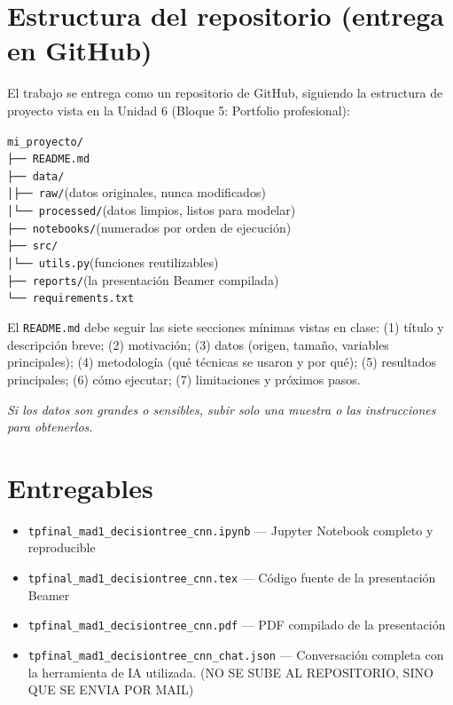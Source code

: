 \documentclass[11pt,a4paper]{article}
\newcommand{\codigo}[1]{\texttt{#1}}
\begin{document}
\section{Estructura del repositorio (entrega en GitHub)}
El trabajo se entrega como un repositorio de GitHub, siguiendo la estructura de proyecto vista en la Unidad 6 (Bloque 5: Portfolio profesional):
\begin{center}
\begin{minipage}{0.82\textwidth}
\codigo{mi\_proyecto/}\\
\codigo{\phantom{x}├── README.md}\\
\codigo{\phantom{x}├── data/}\\
\codigo{\phantom{x}│\phantom{xx}├── raw/}\hfill (datos originales, nunca modificados)\\
\codigo{\phantom{x}│\phantom{xx}└── processed/}\hfill (datos limpios, listos para modelar)\\
\codigo{\phantom{x}├── notebooks/}\hfill (numerados por orden de ejecuci\'on)\\
\codigo{\phantom{x}├── src/}\\
\codigo{\phantom{x}│\phantom{xx}└── utils.py}\hfill (funciones reutilizables)\\
\codigo{\phantom{x}├── reports/}\hfill (la presentaci\'on Beamer compilada)\\
\codigo{\phantom{x}└── requirements.txt}
\end{minipage}
\end{center}

El \codigo{README.md} debe seguir las siete secciones m\'inimas vistas en clase: (1) t\'itulo y descripci\'on breve; (2) motivaci\'on; (3) datos (origen, tama\~no, variables principales); (4) metodolog\'ia (qu\'e t\'ecnicas se usaron y por qu\'e); (5) resultados principales; (6) c\'omo ejecutar; (7) limitaciones y pr\'oximos pasos.

\textit{Si los datos son grandes o sensibles, subir solo una muestra o las instrucciones para obtenerlos.}

\section{Entregables}
\begin{itemize}[leftmargin=2em,itemsep=2pt]
    \item \codigo{tpfinal\_mad1\_decisiontree\_cnn.ipynb} --- Jupyter Notebook completo y reproducible
    \item \codigo{tpfinal\_mad1\_decisiontree\_cnn.tex} --- C\'odigo fuente de la presentaci\'on Beamer
    \item \codigo{tpfinal\_mad1\_decisiontree\_cnn.pdf} --- PDF compilado de la presentaci\'on
    \item \codigo{tpfinal\_mad1\_decisiontree\_cnn\_chat.json} --- Conversaci\'on completa con la herramienta de IA utilizada. (NO SE SUBE AL REPOSITORIO, SINO QUE SE ENVIA POR MAIL)
\end{itemize}
\end{document}
